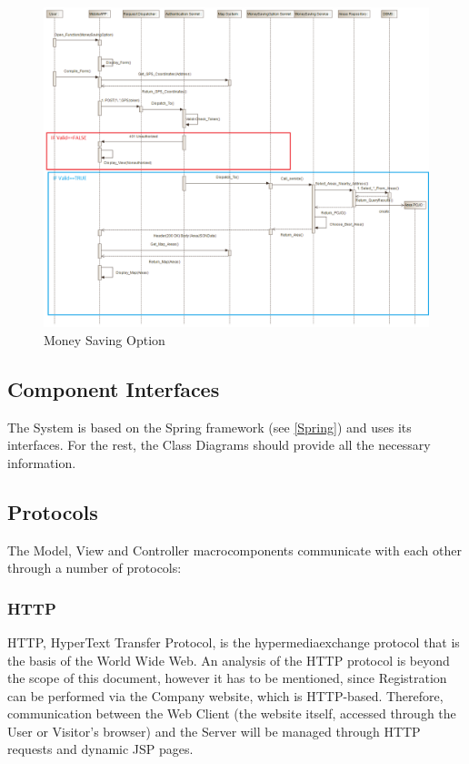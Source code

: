 \documentclass[12pt]{article}
\begin{document}
\begin{figure}[h]
	\centering
	\includegraphics[width=\textwidth]{../Images/Sequence_Final/Money_Saving}
	\caption{Money Saving Option}
\end{figure}
\clearpage


\subsection{Component Interfaces}
The System is based on the Spring framework (see \ref{Spring}) and uses its interfaces. For the rest, the Class Diagrams should provide all the necessary information.

\subsection{Protocols}
The Model, View and Controller macrocomponents communicate with each other through a number of protocols:
\subsubsection{HTTP}
HTTP, HyperText Transfer Protocol, is the hypermediaexchange protocol that is the basis of the World Wide Web. An analysis of the HTTP protocol is beyond the scope of this document, however it has to be mentioned, since Registration can be performed via the Company website, which is HTTP-based. Therefore, communication between the Web Client (the website itself, accessed through the User or Visitor's browser) and the Server will be managed through HTTP requests and dynamic JSP pages.
\end{document}
